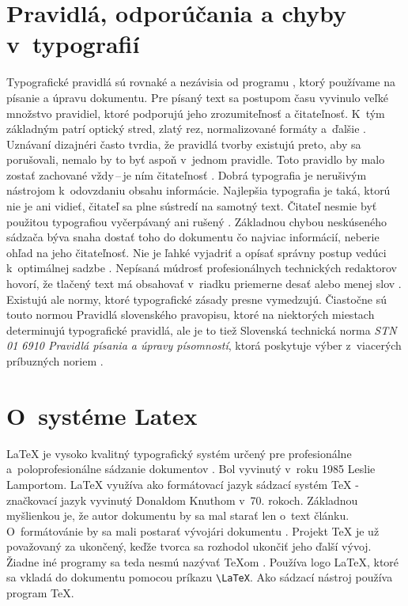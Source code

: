 \documentclass[a4paper,11pt, titlepage]{article}
\begin{document}
\section{Pravidlá, odporúčania a chyby v~typografií}
Typografické pravidlá sú rovnaké a nezávisia od programu , ktorý používame na písanie a úpravu dokumentu. Pre písaný text sa postupom času vyvinulo veľké množstvo pravidiel, ktoré podporujú jeho zrozumiteľnosť a čitateľnosť. K~tým základným patrí optický stred, zlatý rez, normalizované formáty 
a~ďalšie \cite{Culakova:Bakalarska_praca}. Uznávaní dizajnéri často tvrdia, že pravidlá tvorby existujú preto, aby sa porušovali, nemalo by to byť aspoň v~jednom pravidle. Toto pravidlo by malo zostať 
zachované vždy\,--\,je ním čitateľnosť \cite{Samara:Graficky_design}. Dobrá typografia je nerušivým nástrojom k~odovzdaniu obsahu informácie. Najlepšia typografia je taká, ktorú nie je ani vidieť, čitateľ sa plne sústredí na samotný text. Čitateľ nesmie byť použitou typografiou vyčerpávaný ani rušený \cite{Olsak:Typografie_co_to_je}. Základnou chybou neskúseného sádzača býva snaha dostať toho do dokumentu čo najviac informácií, neberie ohľad na jeho čitateľnosť. Nie je ľahké vyjadriť a opísať správny postup vedúci k~optimálnej sadzbe \cite{Vesely:Exkurze_do_taju}. Nepísaná múdrosť profesionálnych technických redaktorov hovorí, že tlačený text má obsahovať v~riadku priemerne desať alebo menej slov \cite{Durst:Vytvareni_rejstriku}. Existujú ale normy, ktoré typografické zásady presne vymedzujú. Čiastočne sú touto normou Pravidlá slovenského pravopisu, ktoré na niektorých miestach determinujú typografické pravidlá, ale je to tiež Slovenská technická norma \textit{STN 01 6910 Pravidlá písania a úpravy písomností}, ktorá poskytuje výber z~viacerých príbuzných noriem \cite{Jurik:Chyby_v_typografii}.

\section{O~systéme Latex}
{\LaTeX} je vysoko kvalitný typografický systém určený pre profesionálne a~poloprofesionálne sádzanie dokumentov \cite{Martinek:Latexove_speciality}. Bol vyvinutý v~roku 1985 Leslie Lamportom. {\LaTeX} využíva ako formátovací jazyk sádzací systém {\TeX} - 
značkovací jazyk vyvinutý Donaldom Knuthom v~70. rokoch. Základnou myšlienkou je, že autor dokumentu by sa mal starať len o~text článku. O~formátovánie by sa mali postarať vývojári dokumentu \cite{Mittelbach:An_Introduction_to_Latex}. Projekt {\TeX} je už považovaný za ukončený, keďže tvorca sa rozhodol ukončiť jeho ďalší vývoj. Žiadne iné programy sa teda nesmú nazývať \TeX om \cite{Syropoulos:Zbornik}.
Používa logo \LaTeX, ktoré sa vkladá do dokumentu pomocou príkazu \verb|\LaTeX|. Ako sádzací nástroj používa program \TeX.


\newpage

\end{document}
